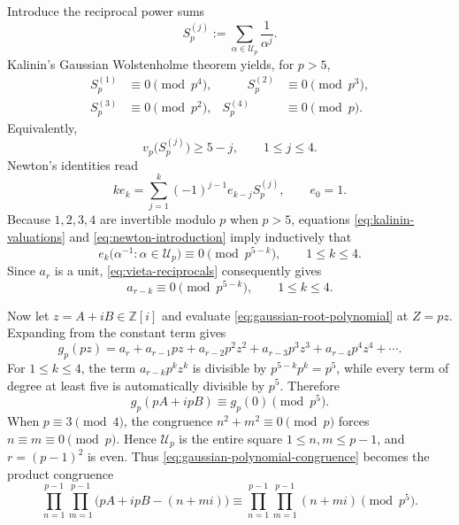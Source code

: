 \documentclass[a4paper,american,11pt]{amsart}
\numberwithin{equation}{section}
\theoremstyle{definition}
\newcommand{\Z}{\mathbb Z}
\newcommand{\vp}{v_p}
\begin{document}
Introduce the reciprocal power sums
\begin{equation}\label{eq:kalinin-power-sums}
S_p^{(j)}
:=
\sum_{\alpha\in\mathcal U_p}\frac{1}{\alpha^j}.
\end{equation}
Kalinin's Gaussian Wolstenholme theorem yields, for $p>5$,
\begin{equation}\label{eq:kalinin-valuations}
\begin{aligned}
S_p^{(1)}&\equiv0\pmod{p^4},
&\qquad S_p^{(2)}&\equiv0\pmod{p^3},\\
S_p^{(3)}&\equiv0\pmod{p^2},
& S_p^{(4)}&\equiv0\pmod p.
\end{aligned}
\end{equation}
Equivalently,
\[
\vp\bigl(S_p^{(j)}\bigr)\geq5-j,
\qquad 1\leq j\leq4.
\]
Newton's identities read
\begin{equation}\label{eq:newton-introduction}
k e_k
=
\sum_{j=1}^{k}(-1)^{j-1}e_{k-j}S_p^{(j)},
\qquad e_0=1.
\end{equation}
Because $1,2,3,4$ are invertible modulo $p$ when $p>5$, equations \eqref{eq:kalinin-valuations} and \eqref{eq:newton-introduction} imply inductively that
\begin{equation}\label{eq:elementary-symmetric-valuations}
e_k\bigl(\alpha^{-1}:\alpha\in\mathcal U_p\bigr)
\equiv0\pmod{p^{5-k}},
\qquad 1\leq k\leq4.
\end{equation}
Since $a_r$ is a unit, \eqref{eq:vieta-reciprocals} consequently gives
\begin{equation}\label{eq:coefficient-valuations}
a_{r-k}\equiv0\pmod{p^{5-k}},
\qquad 1\leq k\leq4.
\end{equation}

Now let $z=A+iB\in\Z[i]$ and evaluate \eqref{eq:gaussian-root-polynomial} at $Z=pz$. Expanding from the constant term gives
\[
g_p(pz)
=
a_r+a_{r-1}pz+a_{r-2}p^2z^2+a_{r-3}p^3z^3+a_{r-4}p^4z^4+\cdots.
\]
For $1\leq k\leq4$, the term $a_{r-k}p^kz^k$ is divisible by $p^{5-k}p^k=p^5$, while every term of degree at least five is automatically divisible by $p^5$. Therefore
\begin{equation}\label{eq:gaussian-polynomial-congruence}
g_p(pA+ipB)\equiv g_p(0)\pmod{p^5}.
\end{equation}
When $p\equiv3\pmod4$, the congruence $n^2+m^2\equiv0\pmod p$ forces $n\equiv m\equiv0\pmod p$. Hence $\mathcal U_p$ is the entire square $1\leq n,m\leq p-1$, and $r=(p-1)^2$ is even. Thus \eqref{eq:gaussian-polynomial-congruence} becomes the product congruence
\begin{equation}\label{eq:kalinin-product}
\prod_{n=1}^{p-1}\prod_{m=1}^{p-1}
\bigl(pA+ipB-(n+mi)\bigr)
\equiv
\prod_{n=1}^{p-1}\prod_{m=1}^{p-1}(n+mi)
\pmod{p^5}.
\end{equation}
\end{document}
